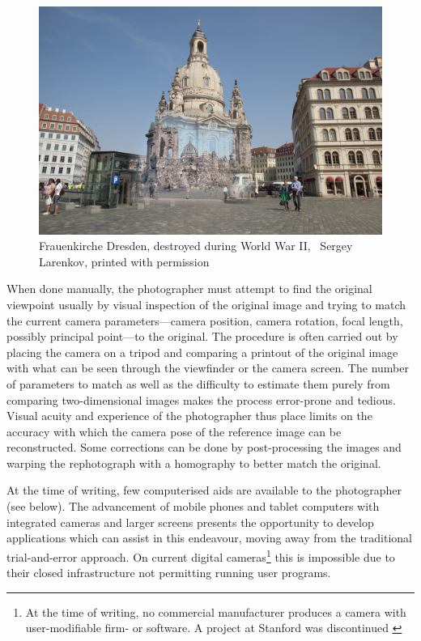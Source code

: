 \begin{figure}
   \includegraphics[width=\textwidth]{gfx/1950_2014_Frauenkirche_small.jpg}
   \caption[Frauenkirche Dresden]{Frauenkirche Dresden, destroyed during World War II,
   \textcopyright\ Sergey Larenkov, printed with permission}
   \label{fig2}
\end{figure}

When done manually, the photographer must attempt to find the original viewpoint 
usually by visual inspection of the original image and trying to match the
current camera parameters---camera position, camera rotation, focal length,
possibly principal point---to the original.
The procedure is often carried out by placing the camera on a tripod and
comparing a printout of the original image with what can be seen through the
viewfinder or the camera screen. The number of parameters to match as well as
the difficulty to estimate them purely from comparing two-dimensional images makes the process
error-prone and tedious. Visual acuity and experience of the photographer thus
place limits on the accuracy with which the camera pose of the reference image
can be reconstructed. Some corrections can be done by post-processing the images
and warping the rephotograph with a homography to better match the original.

At the time of writing, few computerised aids are available to the photographer
(see below).  The advancement of mobile phones and tablet computers with
integrated cameras and larger screens presents the opportunity to develop
applications which can assist in this endeavour, moving away from the
traditional trial-and-error approach.  On current digital cameras\footnote{At the time of writing, no commercial manufacturer produces a camera with
   user-modifiable firm- or software. A project at Stanford \citep{Levoy2010}
was discontinued \cite{FrankenCam}} 
this is impossible due to their closed
infrastructure not permitting running user programs. 

